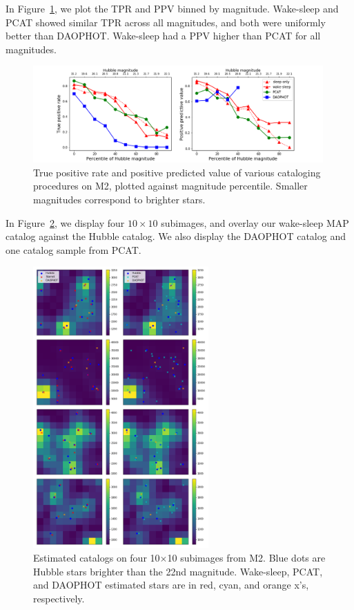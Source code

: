 

In Figure~\ref{fig:summary_stats}, we plot the TPR and PPV binned by magnitude.
Wake-sleep and PCAT showed similar TPR across all magnitudes, and both were
uniformly better than DAOPHOT. Wake-sleep had a PPV higher than PCAT for all magnitudes. 

\begin{figure}[h]
    \centering
    \includegraphics[width=0.99\textwidth]{figures/summary_statistics_m2.png}
    \caption{True positive rate and positive predicted value of various cataloging
    procedures on M2, plotted against magnitude percentile.
    Smaller magnitudes correspond to brighter stars. }
    \label{fig:summary_stats}
\end{figure}

In Figure~\ref{fig:example_subimages}, we display four $10\times10$ subimages, and overlay our wake-sleep MAP catalog against the Hubble catalog. We also display the DAOPHOT catalog and one catalog sample from PCAT.

\begin{figure}[h]
    \centering
    \includegraphics[width=0.6\textwidth]{figures/example_subimages.png}
    \caption{Estimated catalogs on four 10$\times$10 subimages from
    M2. Blue dots are Hubble stars brighter than the 22nd magnitude.
    Wake-sleep, PCAT, and DAOPHOT estimated stars are in
    red, cyan, and orange x's, respectively. }
    \label{fig:example_subimages}
\end{figure}



